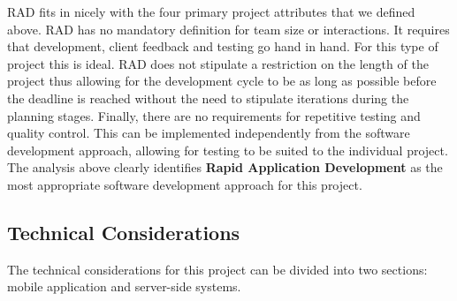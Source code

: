 RAD fits in nicely with the four primary project attributes that we defined above.  RAD has no mandatory definition for team size or interactions.  It requires that development, client feedback and testing go hand in hand.  For this type of project this is ideal.  RAD does not stipulate a restriction on the length of the project thus allowing for the development cycle to be as long as possible before the deadline is reached without the need to stipulate iterations during the planning stages.  Finally, there are no requirements for repetitive testing and quality control.  This can be implemented independently from the software development approach, allowing for testing to be suited to the individual project.\\
The analysis above clearly identifies \textbf{Rapid Application Development} as the most appropriate software development approach for this project.

\subsection{Technical Considerations}
The technical considerations for this project can be divided into two sections: mobile application and server-side systems.


